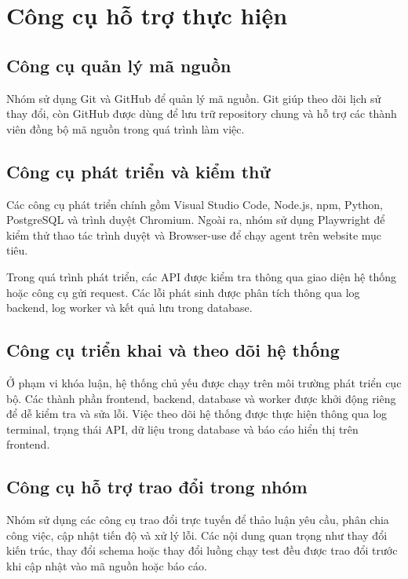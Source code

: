 \section{Công cụ hỗ trợ thực hiện}

\subsection{Công cụ quản lý mã nguồn}

Nhóm sử dụng Git và GitHub để quản lý mã nguồn. Git giúp theo dõi lịch sử thay đổi, còn GitHub được dùng để lưu trữ repository chung và hỗ trợ các thành viên đồng bộ mã nguồn trong quá trình làm việc.

\subsection{Công cụ phát triển và kiểm thử}

Các công cụ phát triển chính gồm Visual Studio Code, Node.js, npm, Python, PostgreSQL và trình duyệt Chromium. Ngoài ra, nhóm sử dụng Playwright để kiểm thử thao tác trình duyệt và Browser-use để chạy agent trên website mục tiêu.

Trong quá trình phát triển, các API được kiểm tra thông qua giao diện hệ thống hoặc công cụ gửi request. Các lỗi phát sinh được phân tích thông qua log backend, log worker và kết quả lưu trong database.

\subsection{Công cụ triển khai và theo dõi hệ thống}

Ở phạm vi khóa luận, hệ thống chủ yếu được chạy trên môi trường phát triển cục bộ. Các thành phần frontend, backend, database và worker được khởi động riêng để dễ kiểm tra và sửa lỗi. Việc theo dõi hệ thống được thực hiện thông qua log terminal, trạng thái API, dữ liệu trong database và báo cáo hiển thị trên frontend.

\subsection{Công cụ hỗ trợ trao đổi trong nhóm}

Nhóm sử dụng các công cụ trao đổi trực tuyến để thảo luận yêu cầu, phân chia công việc, cập nhật tiến độ và xử lý lỗi. Các nội dung quan trọng như thay đổi kiến trúc, thay đổi schema hoặc thay đổi luồng chạy test đều được trao đổi trước khi cập nhật vào mã nguồn hoặc báo cáo.

